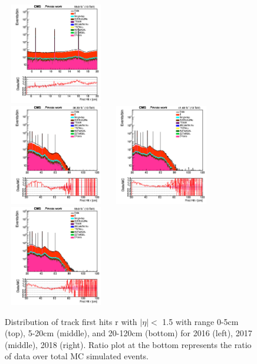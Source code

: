 \documentclass{cernatlasnote}
\begin{document}
\begin{figure}[htp]
 \includegraphics[width=4.6cm, height=4.4cm]{images/emu_channel/2018/18_Plots_for_r_z/track_Track_firstHit_r_TRK_etaLT1p5_r5T20_Log.png}\\
\includegraphics[width=4.6cm, height=4.4cm]{images/emu_channel/2016/16_Plots_for_r_z/track_Track_firstHit_r_TRK_etaLT1p5_rGT20_Log.png}
\includegraphics[width=4.6cm, height=4.4cm]{images/emu_channel/2017/17_Plots_for_r_z/track_Track_firstHit_r_TRK_etaLT1p5_rGT20_Log.png}
 \includegraphics[width=4.6cm, height=4.4cm]{images/emu_channel/2018/18_Plots_for_r_z/track_Track_firstHit_r_TRK_etaLT1p5_rGT20_Log.png}\\
  \caption{Distribution of  track first hits r with $|\eta|<$ 1.5 with range 0-5cm (top), 5-20cm (middle), and 20-120cm (bottom) for 2016 (left), 2017 (middle), 2018 (right). Ratio plot at the bottom represents the ratio of data over total MC simulated events.}
 \label{fig:L0DATAMC}
  \end{figure}
\end{document}
